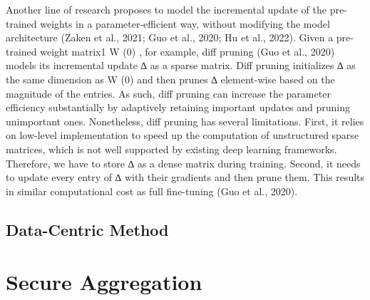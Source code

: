 \documentclass[withindex,glossary,firstyr]{cam-thesis}
\begin{document}
Another line of research proposes to model the incremental update of the pre-trained weights in a parameter-efficient way, without modifying the model architecture (Zaken et al., 2021; Guo et al., 2020; Hu et al., 2022). Given a pre-trained weight matrix1 W (0) , for example, diff pruning (Guo et al., 2020) models its incremental update ∆ as a sparse matrix. Diff pruning initializes ∆ as the same dimension as W (0) and then prunes ∆ element-wise based on the magnitude of the entries. As such, diff pruning can increase the parameter efficiency substantially by adaptively retaining important updates and pruning unimportant ones. Nonetheless, diff pruning has several limitations. First, it relies on low-level implementation to speed up the computation of unstructured sparse matrices, which is not well supported by existing deep learning frameworks. Therefore, we have to store ∆ as a dense matrix during training. Second, it needs to update every entry of ∆ with their gradients and then prune them. This results in similar computational cost as full fine-tuning (Guo et al., 2020).


\subsection{Data-Centric Method} 

\section{Secure Aggregation}
\end{document}

